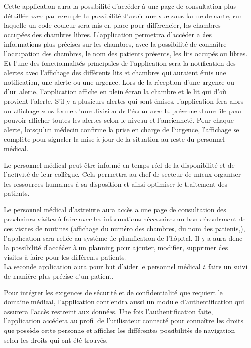 Cette application aura la possibilité d’accéder à une page de consultation plus détaillée avec par exemple la possibilité d’avoir une vue sous forme de carte, sur laquelle un code couleur sera mis en place pour différencier, les chambres occupées des chambres libres. L’application permettra d’accéder a des informations plus précises sur les chambres, avec la possibilité de connaître l’occupation des chambres, le nom des patients présents, les lits occupés ou libres. Et l’une des fonctionnalités principales de l’application sera la notification des alertes avec l’affichage des différents lits et chambres qui auraient émis une notification, une alerte ou une urgence. Lors de la réception d’une urgence ou d’un alerte, l’application affiche en plein écran la chambre et le lit qui d’où provient l’alerte. S’il y a plusieurs alertes qui sont émises, l’application fera alors un affichage sous forme d’une division de l’écran avec la présence d’une file pour pouvoir afficher toutes les alertes selon le niveau et l’ancienneté. Pour chaque alerte, lorsqu’un médecin confirme la prise en charge de l’urgence, l’affichage se complète pour signaler la mise à jour de la situation au reste du personnel médical.

Le personnel médical peut être informé en temps réel de la disponibilité et de l’activité de leur collègue. Cela permettra au chef de secteur de mieux organiser les ressources humaines à sa disposition et ainsi optimiser le traitement des patients.

Le personnel médical d’astreinte aura accès a une page de consultation des prochaines visites à faire avec les informations nécessaires au bon déroulement de ces visites de routines (affichage du numéro des chambres, du nom des patients,), l’application sera reliée au système de planification de l’hôpital. Il y a aura donc la possibilité d’accéder à un planning pour ajouter, modifier, supprimer des visites à faire pour les différents patients.
\\

La seconde application aura pour but d’aider le personnel médical à faire un suivi de manière plus précise d’un patient.

Pour intégrer les exigences de sécurité et de confidentialité que requiert le domaine médical, l’application contiendra aussi un module d’authentification qui assurera l’accès restreint aux données. Une fois l’authentification faite, l’application accédera au profil de l’utilisateur connecté pour connaître les droits que possède cette personne et afficher les différentes possibilités de navigation selon les droits qui ont été trouvés.

